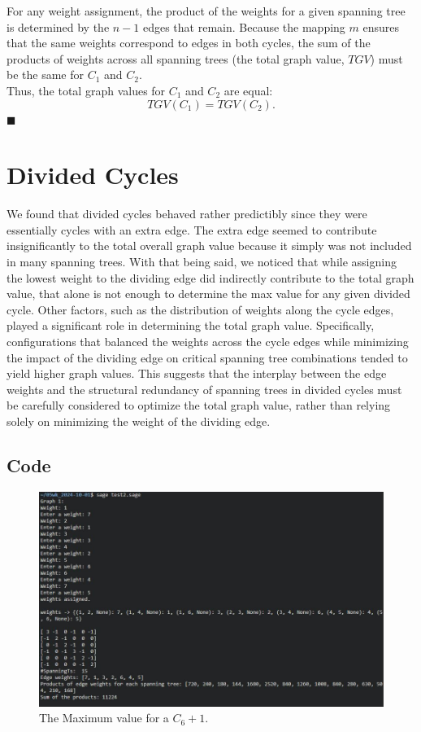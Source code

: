 \documentclass[12pt,letterpaper]{article}
\begin{document}
For any weight assignment, the product of the weights for a given spanning tree is determined by the \( n-1 \) edges that remain. Because the mapping \( m \) ensures that the same weights correspond to edges in both cycles, the sum of the products of weights across all spanning trees (the total graph value, \( TGV \)) must be the same for \( C_1 \) and \( C_2 \).\\

Thus, the total graph values for \( C_1 \) and \( C_2 \) are equal:
\[
TGV(C_1) = TGV(C_2).
\]$\blacksquare$\\

\section{Divided Cycles} \label{DC}
We found that divided cycles behaved rather predictibly since they were essentially cycles with an extra edge. The extra edge seemed to contribute insignificantly to the total overall graph value because it simply was not included in many spanning trees. With that being said, we noticed that while assigning the lowest weight to the dividing edge did indirectly contribute to the total graph value, that alone is not enough to determine the max value for any given divided cycle. Other factors, such as the distribution of weights along the cycle edges, played a significant role in determining the total graph value. Specifically, configurations that balanced the weights across the cycle edges while minimizing the impact of the dividing edge on critical spanning tree combinations tended to yield higher graph values. This suggests that the interplay between the edge weights and the structural redundancy of spanning trees in divided cycles must be carefully considered to optimize the total graph value, rather than relying solely on minimizing the weight of the dividing edge.

\subsection{Code}

	\begin{figure}[h!]  
    \begin{center}
    \includegraphics[width=5in]{f3.1.jpg}
    \caption{\label{Marble} The Maximum value for a $C_6 + 1$.}
    \end{center}
	\end{figure}
\end{document}
